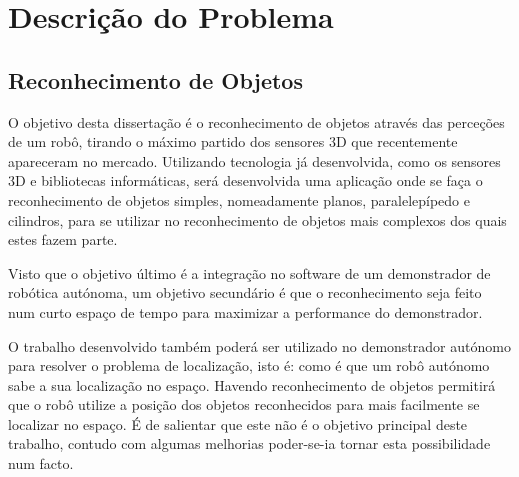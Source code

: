 \chapter{Descrição do Problema}\label{chap:chap3}

\section*{}



\section{Reconhecimento de Objetos}


O objetivo desta dissertação é o reconhecimento de objetos através das perceções de um robô, tirando o máximo partido dos sensores 3D que recentemente apareceram no mercado. Utilizando tecnologia já desenvolvida, como os sensores 3D e bibliotecas informáticas, será desenvolvida uma aplicação onde se faça o reconhecimento de objetos simples, nomeadamente planos, paralelepípedo e cilindros, para se utilizar no reconhecimento de objetos mais complexos dos quais estes fazem parte.

Visto que o objetivo último é a integração no software de um demonstrador de robótica autónoma, um objetivo secundário é que o reconhecimento seja feito num curto espaço de tempo para maximizar a performance do demonstrador.

O trabalho desenvolvido também poderá ser utilizado no demonstrador autónomo para resolver o problema de localização, isto é: como é que um robô autónomo sabe a sua localização no espaço. Havendo reconhecimento de objetos permitirá que o robô utilize a posição dos objetos reconhecidos para mais facilmente se localizar no espaço. É de salientar que este não é o objetivo principal deste trabalho, contudo com algumas melhorias poder-se-ia tornar esta possibilidade num facto.


